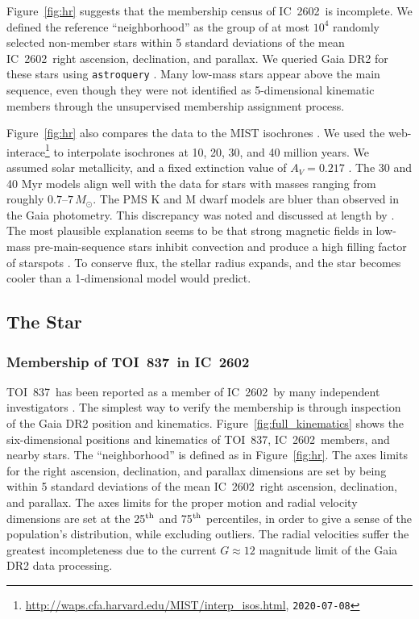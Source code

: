 \documentclass[12pt,twocolumn,tighten]{aastex63}
\newcommand{\tn}{TOI~837} %
\newcommand{\cn}{IC~2602} %
\begin{document}
Figure~\ref{fig:hr} suggests that the membership census of \cn\ is
incomplete.  We defined the reference ``neighborhood'' as the group of
at most $10^4$ randomly selected non-member stars within 5 standard
deviations of the mean \cn\ right ascension, declination, and
parallax.  We queried Gaia DR2 for these stars using
\texttt{astroquery} \citep{astroquery_2018}.  Many low-mass stars
appear above the main sequence, even though they were not identified
as 5-dimensional kinematic members through the unsupervised
\citet{cantatgaudin_gaia_2018} membership assignment process.

Figure~\ref{fig:hr} also compares the data to the MIST isochrones
\citep{choi_mesa_2016}.  We used the
web-interace\footnote{\url{http://waps.cfa.harvard.edu/MIST/interp_isos.html},
\texttt{2020-07-08}} to interpolate isochrones at 10, 20, 30, and 40
million years. We assumed solar metallicity, and a fixed extinction
value of $A_V = 0.217$ \citep{randich_gaiaeso_2018}.  The 30 and 40
Myr models align well with the data for stars with masses ranging from
roughly $0.7$--$7\,M_\odot$.  The PMS K and M dwarf models are bluer
than observed in the Gaia photometry.  This discrepancy was noted and
discussed at length by \citet{choi_mesa_2016}.  The most plausible
explanation seems to be that strong magnetic fields in low-mass
pre-main-sequence stars inhibit convection and produce a high filling
factor of starspots \citep[{\it
e.g.},][]{stauffer_why_2003,feiden_magnetic_2013}. To conserve flux,
the stellar radius expands, and the star becomes cooler than a
1-dimensional model would predict.


\subsection{The Star}
\label{subsec:star}

\subsubsection{Membership of \tn\ in \cn}
\label{subsec:member}

\tn\ has been reported as a member of \cn\ by many independent
investigators \citep[{\it
e.g.},][]{Kharchenko_et_al_2013,oh_comoving_2017,cantatgaudin_gaia_2018,damiani_stellar_2019,kounkel_untangling_2019}.
The simplest way to verify the membership is through inspection of the
Gaia DR2 position and kinematics.  Figure~\ref{fig:full_kinematics}
shows the six-dimensional positions and kinematics of \tn, \cn\
members, and nearby stars.  The ``neighborhood'' is defined as in
Figure~\ref{fig:hr}.  The axes limits for the right ascension,
declination, and parallax dimensions are set by being within 5
standard deviations of the mean \cn\ right ascension, declination, and
parallax.  The axes limits for the proper motion and radial velocity
dimensions are set at the 25$^{\rm th}$ and 75$^{\rm th}$ percentiles,
in order to give a sense of the population's distribution, while
excluding outliers.  The radial velocities suffer the greatest
incompleteness due to the current $G\approx12$ magnitude limit of the
Gaia DR2 data processing.
\end{document}

